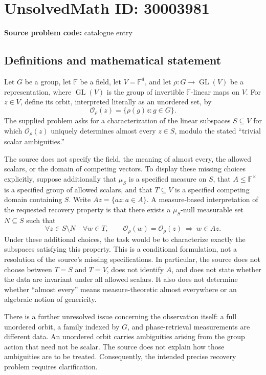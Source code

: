 \documentclass[11pt]{article}
\begin{document}
\section*{UnsolvedMath ID: 30003981}
\textbf{Source problem code:} catalogue entry
\subsection{Definitions and mathematical statement}
Let \(G\) be a group, let \(\mathbb F\) be a field, let \(V=\mathbb F^d\), and let \(\rho:G\to\operatorname{GL}(V)\) be a representation, where \(\operatorname{GL}(V)\) is the group of invertible \(\mathbb F\)-linear maps on \(V\). For \(z\in V\), define its orbit, interpreted literally as an unordered set, by
\[
\mathcal O_\rho(z)=\{\rho(g)z:g\in G\}.
\]
The supplied problem asks for a characterization of the linear subspaces \(S\subseteq V\) for which \(\mathcal O_\rho(z)\) uniquely determines almost every \(z\in S\), modulo the stated ``trivial scalar ambiguities.''

The source does not specify the field, the meaning of almost every, the allowed scalars, or the domain of competing vectors. To display these missing choices explicitly, suppose additionally that \(\mu_S\) is a specified measure on \(S\), that \(A\leq\mathbb F^\times\) is a specified group of allowed scalars, and that \(T\subseteq V\) is a specified competing domain containing \(S\). Write \(Az=\{az:a\in A\}\). A measure-based interpretation of the requested recovery property is that there exists a \(\mu_S\)-null measurable set \(N\subseteq S\) such that
\[
\forall z\in S\setminus N\quad\forall w\in T,\qquad
\mathcal O_\rho(w)=\mathcal O_\rho(z)
\ \Longrightarrow\ w\in Az.
\]
Under these additional choices, the task would be to characterize exactly the subspaces satisfying this property. This is a conditional formulation, not a resolution of the source's missing specifications. In particular, the source does not choose between \(T=S\) and \(T=V\), does not identify \(A\), and does not state whether the data are invariant under all allowed scalars. It also does not determine whether ``almost every'' means measure-theoretic almost everywhere or an algebraic notion of genericity.

There is a further unresolved issue concerning the observation itself: a full unordered orbit, a family indexed by \(G\), and phase-retrieval measurements are different data. An unordered orbit carries ambiguities arising from the group action that need not be scalar. The source does not explain how those ambiguities are to be treated. Consequently, the intended precise recovery problem requires clarification.
\end{document}

